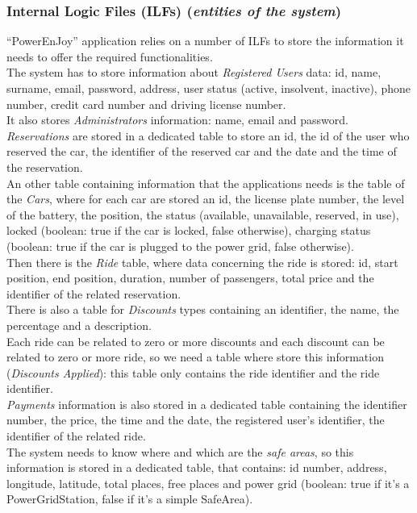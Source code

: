 \subsubsection{Internal Logic Files (ILFs) (\textit{entities of the system})}
``PowerEnJoy'' application relies on a number of ILFs to store the information it needs to offer the required functionalities. \\
The system has to store information about \textit{Registered Users} data: id, name, surname, email, password, address, user status (active, insolvent, inactive), phone number, credit card number and driving license number. \\
It also stores \textit{Administrators} information: name, email and password. \\
\textit{Reservations} are stored in a dedicated table to store an id, the id of the user who reserved the car, the identifier of the reserved car and the date and the time of the reservation. \\
An other table containing information that the applications needs is the table of the \textit{Cars}, where for each car are stored an id, the license plate number, the level of the battery, the position, the status (available, unavailable, reserved, in use), locked (boolean: true if the car is locked, false otherwise), charging status (boolean: true if the car is plugged to the power grid, false otherwise). \\
Then there is the \textit{Ride} table, where data concerning the ride is stored: id, start position, end position, duration, number of passengers, total price and the identifier of the related reservation. \\ 
There is also a table for \textit{Discounts} types containing an identifier, the name, the percentage and a description. \\ 
Each ride can be related to zero or more discounts and each discount can be related to zero or more ride, so we need a table where store this information (\textit{Discounts Applied}): this table only contains the ride identifier and the ride identifier. \\
\textit{Payments} information is also stored in a dedicated table containing the identifier number, the price, the time and the date, the registered user's identifier, the identifier of the related ride. \\
The system needs to know where and which are the \textit{safe areas}, so this information is stored in a dedicated table, that contains: id number, address, longitude, latitude, total places, free places and power grid (boolean: true if it's a PowerGridStation, false if it's a simple SafeArea).

